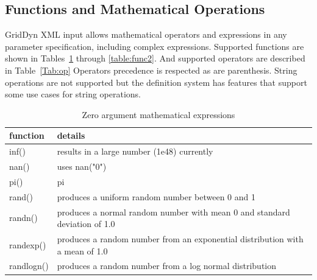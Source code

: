 \documentclass[12pt]{article} %
\begin{document}
\subsection{Functions and Mathematical Operations} \label{sec:func}
GridDyn XML input allows mathematical operators and expressions in any parameter specification, including complex expressions.  Supported functions are shown in Tables~\ref{table:func0} through \ref{table:func2}. And supported operators are described in Table~\ref{Tab:op}  Operators precedence is respected as are parenthesis.   String operations are not supported but the definition system has features that support some use cases for string operations.   
\begin{table}[ht]
	
	\caption{Zero argument mathematical expressions} %
	\centering %
	\begin{tabular}{l p{11cm}} %
		\hline %
		function & details \\ [0.5ex] %
		\hline %
	inf() & results in a large number (1e48) currently \\
	nan()& uses nan("0") \\ 
	pi() & pi \\
	rand() & produces a uniform random number between 0 and 1 \\
	randn() & produces a normal random number with mean 0 and standard deviation of 1.0 \\
	randexp() & produces a random number from an exponential distribution with a mean of 1.0 \\
	randlogn() & produces a random number from a log normal distribution \\	
		\hline %
	\end{tabular}
	\label{table:func0}
\end{table} 
\end{document}
